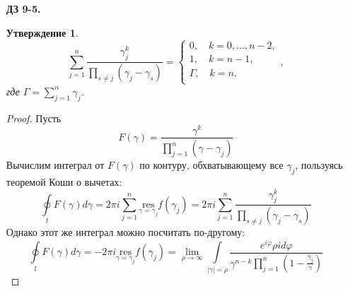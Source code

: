 \documentclass[12pt]{article}
\newtheorem{utv}{Утверждение}
\theoremstyle{definition}
\begin{document}
\begin{itemize}
\begin{proof}
\begin{equation}
            \gamma_k\geq e_{2k-1}\rightarrow u\leq\sum\limits_{j=0}^{2n}e_j-2\sum\limits_{j=1}^ne_{2j-1}=\sum\limits_{j=0}^{n-1}(e_{2j}-e_{2j+1})+e_{2n}
        \end{equation}
        Из (\ref{eq10}) следует, что $e_{2j+1}\geq e_{2j}$. Значит
        \begin{equation}
            u\leq e_{2n}
        \end{equation}
        \begin{equation}
            \boxed{e_0+e_1-e_{2n}\leq u\leq e_{2n}}
        \end{equation}
    \end{proof}
    \item[\textbf{ДЗ 9-5.}]
    \begin{utv}
    \begin{equation}
        \sum\limits_{j=1}^n\frac{\gamma_j^k}{\prod\limits_{s\neq j}(\gamma_j-\gamma_s)}=\left\{
        \begin{array}{l}
        0, \quad k=0,...,n-2,\\
        1, \quad k=n-1,\\
        \Gamma, \quad k=n.\\
        \end{array}
        \right.,
    \end{equation}
    где $\Gamma=\sum\limits_{j=1}^n\gamma_j$.
    \end{utv}
    \begin{proof}
        Пусть
        \begin{equation}
            F(\gamma)=\frac{\gamma^k}{\prod\limits_{j=1}^n(\gamma-\gamma_j)}
        \end{equation}
        Вычислим интеграл от $F(\gamma)$ по контуру, обхватывающему все $\gamma_j$, пользуясь теоремой Коши о вычетах:
        \begin{equation}
            \oint\limits_l F(\gamma)d\gamma=2\pi i\sum\limits_{j=1}^n\underset{\gamma=\gamma_j}{\text{res}}f(\gamma_j)=2\pi i\sum\limits_{j=1}^n\frac{\gamma_j^k}{\prod\limits_{s\neq j}(\gamma_j-\gamma_s)}
        \end{equation}
        Однако этот же интеграл можно посчитать по-другому:
        \begin{equation}
            \oint\limits_l F(\gamma)d\gamma=-2\pi i\underset{\gamma=\gamma_j}{\text{res}}f(\gamma_j)=\lim\limits_{\rho\rightarrow\infty}\int\limits_{|\gamma|=\rho}\frac{e^{i\varphi}\rho id\varphi}{\gamma^{n-k}\prod\limits_{j=1}^n(1-\frac{\gamma_j}{\gamma})}
        \end{equation}

\end{proof}
\end{itemize}
\end{document}
